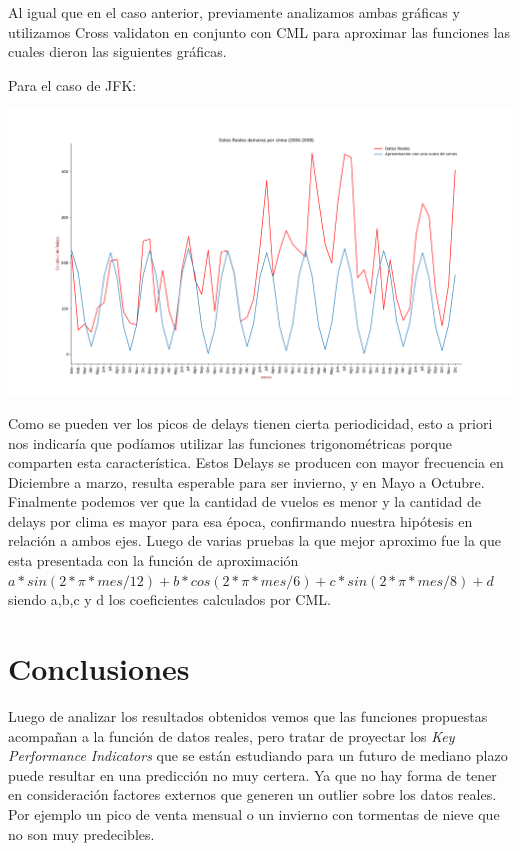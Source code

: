 \documentclass{endm}
\begin{document}
Al igual que en el caso anterior, previamente analizamos ambas gráficas y utilizamos Cross validaton en conjunto con CML para aproximar las funciones las cuales dieron las siguientes gráficas.

Para el caso de JFK:
\begin{center}
\includegraphics[scale=0.3]{imagenes/nuevas/DelaySeno.png}
\end{center}

Como se pueden ver los picos de delays tienen cierta periodicidad, esto a priori nos indicaría que podíamos utilizar las funciones trigonométricas porque comparten esta característica. 
Estos Delays se producen con mayor frecuencia en Diciembre a marzo, resulta esperable para ser invierno, y en Mayo a Octubre. Finalmente podemos ver que la cantidad de vuelos es menor y la cantidad de delays por clima es mayor para esa época, confirmando nuestra hipótesis en relación a ambos ejes.
Luego de varias pruebas la que mejor aproximo fue la que esta presentada con la función de aproximación $a* sin(2*\pi*mes/12)+b*cos(2*\pi*mes/6)+c*sin(2*\pi*mes/8)+d$ siendo a,b,c y d los coeficientes calculados por CML.

\section{Conclusiones}

Luego de analizar los resultados obtenidos vemos que las funciones propuestas acompañan a la función de datos reales, pero tratar de proyectar los \textit{Key Performance Indicators} que se están estudiando para un futuro de mediano plazo puede resultar en una predicción no muy certera. Ya que no hay forma de tener en consideración factores externos que generen un outlier sobre los datos reales. Por ejemplo un pico de venta mensual o un invierno con tormentas de nieve que no son muy predecibles.
\end{document}
